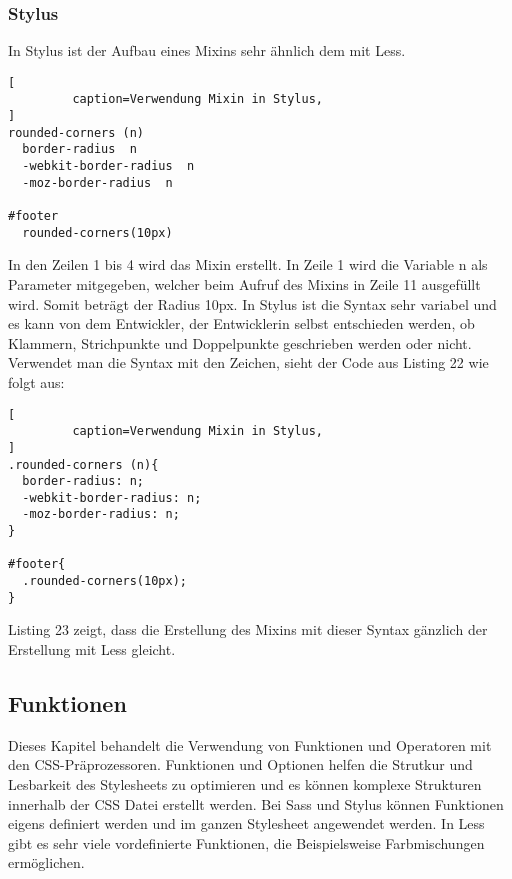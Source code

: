 \subsubsection{Stylus}
In Stylus ist der Aufbau eines Mixins sehr ähnlich dem mit Less. 
\begin{lstlisting}[
         caption=Verwendung Mixin in Stylus,
]
rounded-corners (n) 
  border-radius  n
  -webkit-border-radius  n
  -moz-border-radius  n

#footer 
  rounded-corners(10px)

\end{lstlisting}
In den Zeilen 1 bis 4 wird das Mixin erstellt. In Zeile 1 wird die Variable n als Parameter mitgegeben, welcher beim Aufruf des Mixins in Zeile 11 ausgefüllt wird. Somit beträgt der Radius 10px. \newline
In Stylus ist die Syntax sehr variabel und es kann von dem Entwickler, der Entwicklerin selbst entschieden werden, ob Klammern, Strichpunkte und Doppelpunkte geschrieben werden oder nicht. Verwendet man die Syntax mit den Zeichen, sieht der Code aus Listing 22 wie folgt aus:
\begin{lstlisting}[
         caption=Verwendung Mixin in Stylus,
]
.rounded-corners (n){ 
  border-radius: n;
  -webkit-border-radius: n;
  -moz-border-radius: n;
}

#footer{ 
  .rounded-corners(10px);
}
\end{lstlisting}
Listing 23 zeigt, dass die Erstellung des Mixins mit dieser Syntax gänzlich der Erstellung mit Less gleicht.  
\subsection{Funktionen}
Dieses Kapitel behandelt die Verwendung von Funktionen und Operatoren mit den CSS-Präprozessoren. Funktionen und Optionen helfen die Strutkur und Lesbarkeit des Stylesheets zu optimieren und es können komplexe Strukturen innerhalb der CSS Datei erstellt werden. \newline
Bei Sass und Stylus können Funktionen eigens definiert werden und im ganzen Stylesheet angewendet werden.\newline
In Less gibt es sehr viele vordefinierte Funktionen, die Beispielsweise Farbmischungen ermöglichen.
